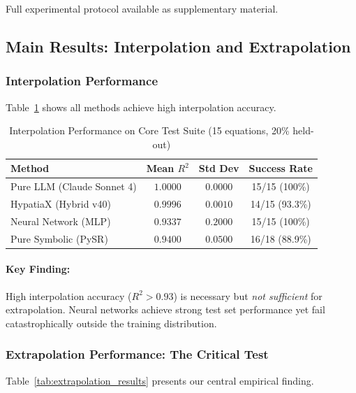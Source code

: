 \documentclass[twoside,11pt]{article}
\begin{document}
Full experimental protocol available as supplementary material.


\subsection{Main Results: Interpolation and Extrapolation}

\subsubsection{Interpolation Performance}

Table~\ref{tab:interpolation_results} shows all methods achieve high interpolation accuracy.

\begin{table}[htbp]
\centering
\caption{Interpolation Performance on Core Test Suite (15 equations, 20\% held-out)}
\label{tab:interpolation_results}
\begin{tabular}{lccc}
\toprule
\textbf{Method} & \textbf{Mean $R^2$} & \textbf{Std Dev} & \textbf{Success Rate} \\
\midrule
Pure LLM (Claude Sonnet 4) & $1.0000$ & $0.0000$ & 15/15 (100\%) \\
HypatiaX (Hybrid v40) & $0.9996$ & $0.0010$ & 14/15 (93.3\%) \\
Neural Network (MLP) & $0.9337$ & $0.2000$ & 15/15 (100\%) \\
Pure Symbolic (PySR) & $0.9400$ & $0.0500$ & 16/18 (88.9\%) \\
\bottomrule
\end{tabular}
\end{table}

\paragraph{Key Finding:} High interpolation accuracy ($R^2 > 0.93$) is necessary but \emph{not sufficient} for extrapolation. Neural networks achieve strong test set performance yet fail catastrophically outside the training distribution.

\subsubsection{Extrapolation Performance: The Critical Test}

Table~\ref{tab:extrapolation_results} presents our central empirical finding.
\end{document}
